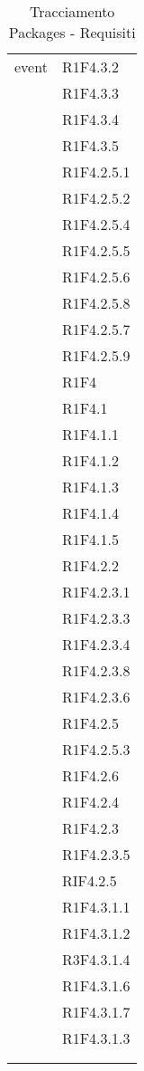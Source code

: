 \begin{center}
\begin{longtable}{|p{7cm}|p{7cm}|}
		event & R1F4.3.2 \\ & R1F4.3.3 \\ & R1F4.3.4 \\ & R1F4.3.5 \\ & R1F4.2.5.1 \\ & R1F4.2.5.2 \\ & R1F4.2.5.4 \\ & R1F4.2.5.5 \\ & R1F4.2.5.6 \\ & R1F4.2.5.8 \\ & R1F4.2.5.7 \\ & R1F4.2.5.9 \\ & R1F4 \\ & R1F4.1 \\ & R1F4.1.1 \\ & R1F4.1.2 \\ & R1F4.1.3 \\ & R1F4.1.4 \\ & R1F4.1.5 \\ & R1F4.2.2 \\ & R1F4.2.3.1 \\ & R1F4.2.3.3 \\ & R1F4.2.3.4 \\ & R1F4.2.3.8 \\ & R1F4.2.3.6 \\ & R1F4.2.5 \\ & R1F4.2.5.3 \\ & R1F4.2.6 \\ & R1F4.2.4 \\ & R1F4.2.3 \\ & R1F4.2.3.5 \\ & RIF4.2.5 \\ & R1F4.3.1.1 \\ & R1F4.3.1.2 \\ & R3F4.3.1.4 \\ & R1F4.3.1.6 \\ & R1F4.3.1.7 \\ & R1F4.3.1.3 \\ & \\ \hline
	\caption[Tracciamento Packages - Requisiti]{Tracciamento Packages - Requisiti}
	\label{tabella: Tracciamento Packages - Requisiti}
	\end{longtable}
\end{center}
